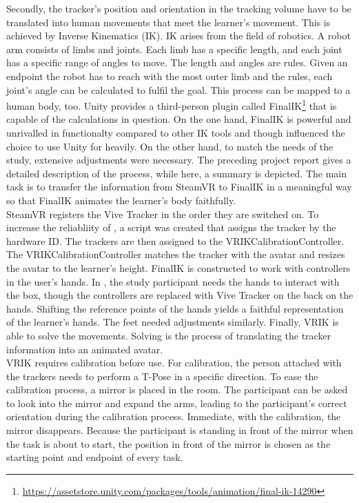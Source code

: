 Secondly, the tracker's position and orientation in the tracking volume have to be translated into human movements that meet the learner's movement. This is achieved by Inverse Kinematics (IK). IK arises from the field of robotics. A robot arm consists of limbs and joints. Each limb has a specific length, and each joint has a specific range of angles to move. The length and angles are rules. Given an endpoint the robot has to reach with the most outer limb and the rules, each joint's angle can be calculated to fulfil the goal. This process can be mapped to a human body, too. Unity provides a third-person plugin called FinalIK\footnote{\href{https://assetstore.unity.com/packages/tools/animation/final-ik-14290}{https://assetstore.unity.com/packages/tools/animation/final-ik-14290}} that is capable of the calculations in question. On the one hand, FinalIK is powerful and unrivalled in functionalty compared to other IK tools and though influenced the choice to use Unity for \exgo heavily. On the other hand, to match the needs of the study, extensive adjustments were necessary. The preceding project report gives a detailed description of the process, while here, a summary is depicted. The main task is to transfer the information from SteamVR to FinalIK in a meaningful way so that FinalIK animates the learner's body faithfully.\\
SteamVR registers the Vive Tracker in the order they are switched on. To increase the reliabliity of \exgo, a script was created that assigns the tracker by the hardware ID. The trackers are then assigned to the VRIKCalibrationController. The VRIKCalibrationController matches the tracker with the avatar and resizes the avatar to the learner's height. FinalIK is constructed to work with controllers in the user's hands. In \exgo, the study participant needs the hands to interact with the box, though the controllers are replaced with Vive Tracker on the back on the hands. Shifting the reference points of the hands yields a faithful representation of the learner's hands. The feet needed adjustments similarly. Finally, VRIK is able to solve the movements. Solving is the process of translating the tracker information into an animated avatar.\\
VRIK requires calibration before use. For calibration, the person attached with the trackers needs to perform a T-Pose in a specific direction. To ease the calibration process, a mirror is placed in the room. The participant can be asked to look into the mirror and expand the arms, leading to the participant's correct orientation during the calibration process. Immediate, with the calibration, the mirror disappears. Because the participant is standing in front of the mirror when the task is about to start, the position in front of the mirror is chosen as the starting point and endpoint of every task.


